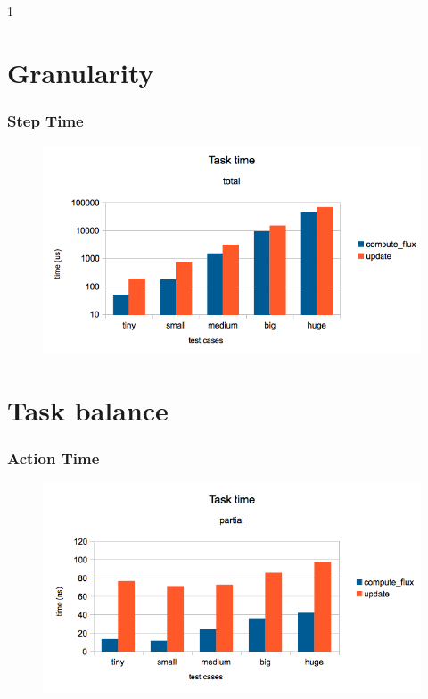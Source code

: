 1\documentclass{beamer}
\begin{document}
\section{Granularity}
\begin{frame}
	\frametitle{Step Time}
	\begin{figure}
		\begin{center}
			\includegraphics[width=\textwidth]{images/slides.march/tasktime_total.png}
		\end{center}
	\end{figure}
\end{frame}

\section{Task balance}
\begin{frame}
	\frametitle{Action Time}
	\begin{figure}
		\begin{center}
			\includegraphics[width=\textwidth]{images/slides.march/tasktime_partial.png}
		\end{center}
	\end{figure}
\end{frame}
\end{document}
